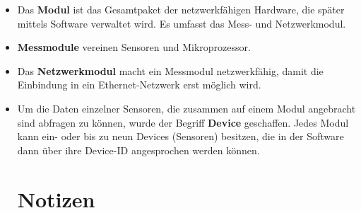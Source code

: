 \documentclass[a4paper,14pt,headsepline]{scrartcl}
\begin{document}
\newpage

\begin{figure}[h]
\begin{center}
\end{center}
\end{figure}

\begin{itemize}

\item Das \textbf{Modul} ist das Gesamtpaket der netzwerkfähigen Hardware, die später mittels Software verwaltet wird. Es umfasst das Mess- und Netzwerkmodul.
\item \textbf{Messmodule} vereinen Sensoren und Mikroprozessor. 
\item Das \textbf{Netzwerkmodul} macht ein Messmodul netzwerkfähig, damit die Einbindung in ein Ethernet-Netzwerk erst möglich wird.
\item Um die Daten einzelner Sensoren, die zusammen auf einem Modul angebracht sind abfragen zu können, wurde der Begriff \textbf{Device} geschaffen. Jedes Modul kann ein- oder bis zu neun Devices (Sensoren) besitzen, die in der Software dann über ihre Device-ID angesprochen werden können.

\newpage

\section*{Notizen}

\end{itemize}
 
\end{document}
